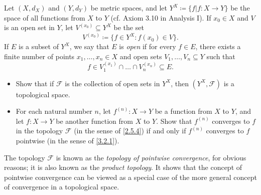 \begin{exercise}\label{ex 3.4.4}
  Let \((X, d_X)\) and \((Y, d_Y)\) be metric spaces, and let \(Y^X \coloneqq \{f | f : X \to Y \}\) be the space of all functions from \(X\) to \(Y\)
  (cf. Axiom 3.10 in Analysis I).
  If \(x_0 \in X\) and \(V\) is an open set in \(Y\), let \(V^{(x_0)} \subseteq Y^X\) be the set
  \[
    V^{(x_0)} \coloneqq \big\{f \in Y^X : f(x_0) \in V\big\}.
  \]
  If \(E\) is a subset of \(Y^X\), we say that \(E\) is \emph{open} if for every \(f \in E\), there exists a finite number of points \(x_1, \dots, x_n \in X\) and open sets \(V_1, \dots, V_n \subseteq Y\) such that
  \[
    f \in V_1^{(x_1)} \cap \dots \cap V_n^{(x_n)} \subseteq E.
  \]
  \begin{itemize}
    \item Show that if \(\mathcal{F}\) is the collection of open sets in \(Y^X\), then \((Y^X , \mathcal{F})\) is a topological space.
    \item For each natural number \(n\), let \(f^{(n)} : X \to Y\) be a function from \(X\) to \(Y\), and let \(f : X \to Y\) be another function from \(X\) to \(Y\).
          Show that \(f^{(n)}\) converges to \(f\) in the topology \(\mathcal{F}\) (in the sense of \cref{2.5.4}) if and only if \(f^{(n)}\) converges to \(f\) pointwise (in the sense of \cref{3.2.1}).
  \end{itemize}
  The topology \(\mathcal{F}\) is known as the \emph{topology of pointwise convergence}, for obvious reasons;
  it is also known as the \emph{product topology}.
  It shows that the concept of pointwise convergence can be viewed as a special case of the more general concept of convergence in a topological space.
\end{exercise}

